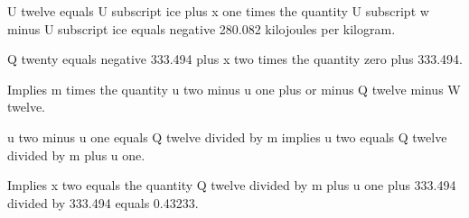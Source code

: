 U twelve equals U subscript ice plus x one times the quantity U subscript w minus U subscript ice equals negative 280.082 kilojoules per kilogram.

Q twenty equals negative 333.494 plus x two times the quantity zero plus 333.494.

Implies m times the quantity u two minus u one plus or minus Q twelve minus W twelve.

u two minus u one equals Q twelve divided by m implies u two equals Q twelve divided by m plus u one.

Implies x two equals the quantity Q twelve divided by m plus u one plus 333.494 divided by 333.494 equals 0.43233.